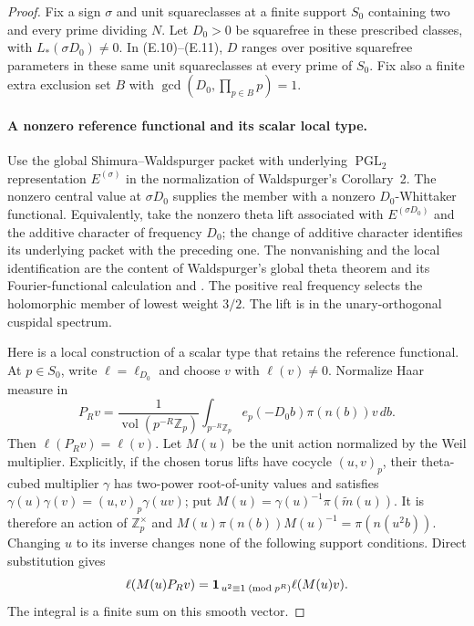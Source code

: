 \documentclass[11pt]{article}
\theoremstyle{definition}
\theoremstyle{remark}
\newcommand{\Z}{\mathbb Z}
\begin{document}
\begin{proof}\leavevmode
Fix a sign $\sigma$ and unit squareclasses at a finite support $S_0$
containing two and every prime dividing $N$. Let $D_0>0$ be squarefree
in these prescribed classes, with $L_*(\sigma D_0)\ne0$.
In (E.10)--(E.11), $D$ ranges over positive squarefree parameters in
these same unit squareclasses at every prime of $S_0$.
Fix also a finite extra exclusion set $B$ with
$\gcd(D_0,\prod_{p\in B}p)=1$.

\paragraph{A nonzero reference functional and its scalar local type.}
Use the global Shimura--Waldspurger packet with underlying
$\operatorname{PGL}_2$ representation $E^{(\sigma)}$ in the
normalization of Waldspurger's Corollary~2. The nonzero central value
at $\sigma D_0$ supplies the member with a nonzero $D_0$-Whittaker
functional. Equivalently, take the nonzero theta lift associated with
$E^{(\sigma D_0)}$ and the additive character of frequency $D_0$;
the change of additive character identifies its underlying packet
with the preceding one. The nonvanishing and the local identification
are the content of Waldspurger's global theta theorem and its
Fourier-functional calculation
\cite[Theorem~1 and Proposition~1]{waldspurgerICM}
and \cite[Proposition~18 and its proof, pp.~466--467]{waldspurger}. The positive real frequency selects the
holomorphic member of lowest weight $3/2$. The lift is in the
unary-orthogonal cuspidal spectrum.

Here is a local construction of a scalar type that retains the
reference functional. At $p\in S_0$, write $\ell=\ell_{D_0}$ and
choose $v$ with $\ell(v)\ne0$. Normalize Haar measure in
\[
 P_Rv=\frac1{\operatorname{vol}(p^{-R}\Z_p)}
       \int_{p^{-R}\Z_p}
          e_p(-D_0b)\pi(n(b))v\,db .
\]
Then $\ell(P_Rv)=\ell(v)$. Let $M(u)$ be the unit action normalized
by the Weil multiplier. Explicitly, if the chosen torus lifts have
cocycle $(u,v)_p$, their theta-cubed multiplier $\gamma$ has
two-power root-of-unity values and satisfies
$\gamma(u)\gamma(v)=(u,v)_p\gamma(uv)$; put
$M(u)=\gamma(u)^{-1}\pi(\widetilde m(u))$.
It is therefore an action of
$\Z_p^\times$ and
$M(u)\pi(n(b))M(u)^{-1}=\pi(n(u^2b))$.
Changing $u$ to its inverse changes none of the following support
conditions. Direct substitution gives
\[
 \ell(M(u)P_Rv)=
 {\bf1}_{\,u^2\equiv1\;(\mathrm{mod}\;p^R)}
                    \ell(M(u)v).
\]
The integral is a finite sum on this smooth vector.


\end{proof}
\end{document}

